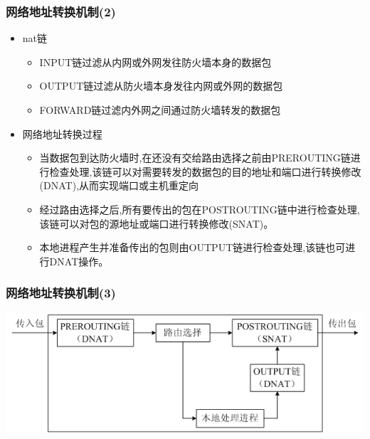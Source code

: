 \documentclass[xcolor=svgnames,presentation]{beamer}
\begin{document}
\begin{frame}
\frametitle{网络地址转换机制(2)}
\label{sec-2-11}
\begin{itemize}

\item nat链
\label{sec-2-11-1}%
\begin{itemize}

\item INPUT链过滤从内网或外网发往防火墙本身的数据包
\label{sec-2-11-1-1}%

\item OUTPUT链过滤从防火墙本身发往内网或外网的数据包
\label{sec-2-11-1-2}%

\item FORWARD链过滤内外网之间通过防火墙转发的数据包
\label{sec-2-11-1-3}%
\end{itemize} %

\item 网络地址转换过程
\label{sec-2-11-2}%
\begin{itemize}

\item 当数据包到达防火墙时,在还没有交给路由选择之前由PREROUTING链进行检查处理,该链可以对需要转发的数据包的目的地址和端口进行转换修改(DNAT),从而实现端口或主机重定向
\label{sec-2-11-2-1}%

\item 经过路由选择之后,所有要传出的包在POSTROUTING链中进行检查处理,该链可以对包的源地址或端口进行转换修改(SNAT)。
\label{sec-2-11-2-2}%

\item 本地进程产生并准备传出的包则由OUTPUT链进行检查处理,该链也可进行DNAT操作。
\label{sec-2-11-2-3}%
\end{itemize} %
\end{itemize} %
\end{frame}
\begin{frame}
\frametitle{网络地址转换机制(3)}
\label{sec-2-12}
\label{sec-2-12-1}

\includegraphics[width=.9\linewidth]{img/iptables5.png}
\end{frame}
\end{document}
